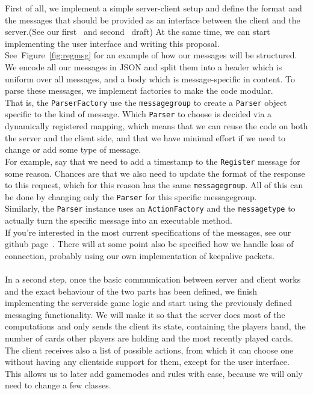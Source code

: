 \documentclass{report}
\newcommand{\rfig}[1]{Figure~\ref{fig:#1}}
\begin{document}
First of all, we implement a simple server-client setup and define the format and the messages that should be provided as an interface between the client and the server.(See our first~\cite{messaging} and second~\cite{messaging2} draft) At the same time, we can start implementing the user interface and writing this proposal.\\
See~\rfig{regmsg} for an example of how our messages will be structured. We encode all our messages in JSON and split them into a header which is uniform over all messages, and a body which is message-specific in content. To parse these messages, we implement factories to make the code modular.\\
That is, the \verb|ParserFactory| use the \verb|messagegroup| to create a \verb|Parser| object specific to the kind of message. Which \verb|Parser| to choose is decided via a dynamically registered mapping, which means that we can reuse the code on both the server and the client side, and that we have minimal effort if we need to change or add some type of message.\\
For example, say that we need to add a timestamp to the \verb|Register| message for some reason. Chances are that we also need to update the format of the response to this request, which for this reason has the same \verb|messagegroup|. All of this can be done by changing only the \verb|Parser| for this specific messagegroup.\\
Similarly, the \verb|Parser| instance uses an \verb|ActionFactory| and the \verb|messagetype| to actually turn the specific message into an executable method.\\
If you're interested in the most current specifications of the messages, see our github page~\cite{github}. There will at some point also be specified how we handle loss of connection, probably using our own implementation of keepalive packets.\\
\\
In a second step, once the basic communication between server and client works and the exact behaviour of the two parts has been defined, we finish implementing the serverside game logic and start using the previously defined messaging functionality.
We will make it so that the server does most of the computations and only sends the client its state, containing the players hand, the number of cards other players are holding and the most recently played cards. The client receives also a list of possible actions, from which it can choose one without having any clientside support for them, except for the user interface. This allows us to later add gamemodes and rules with ease, because we will only need to change a few classes.\\
\end{document}
